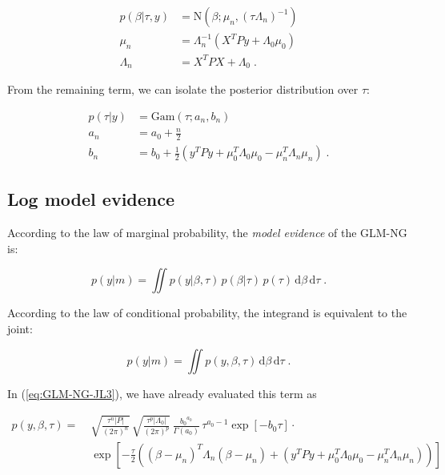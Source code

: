 \vspace{-0.5em}
\begin{equation} \label{eq:GLM-NG-post-beta}
\begin{split}
p(\beta|\tau,y) &= \mathrm{N}(\beta; \mu_n, (\tau \Lambda_n)^{-1}) \\
\mu_n &= \Lambda_n^{-1} (X^T P y + \Lambda_0 \mu_0) \\
\Lambda_n &= X^T P X + \Lambda_0 \; .
\end{split}
\end{equation}

From the remaining term, we can isolate the posterior distribution over $\tau$:

\vspace{-0.5em}
\begin{equation} \label{eq:GLM-NG-post-tau}
\begin{split}
p(\tau|y) &= \mathrm{Gam}(\tau; a_n, b_n) \\
a_n &= a_0 + \frac{n}{2} \\
b_n &= b_0 + \frac{1}{2} (y^T P y + \mu_0^T \Lambda_0 \mu_0 - \mu_n^T \Lambda_n \mu_n) \; .
\end{split}
\end{equation}


\subsection{Log model evidence} \label{sec:GLM-NG-LME}

According to the law of marginal probability, the \textit{model evidence} of the GLM-NG is:

\begin{equation} \label{eq:GLM-NG-ME1}
p(y|m) = \iint p(y|\beta,\tau) \, p(\beta|\tau) \, p(\tau) \, \mathrm{d}\beta \, \mathrm{d}\tau \; .
\end{equation}

According to the law of conditional probability, the integrand is equivalent to the joint:

\begin{equation} \label{eq:GLM-NG-ME2}
p(y|m) = \iint p(y,\beta,\tau) \, \mathrm{d}\beta \, \mathrm{d}\tau \; .
\end{equation}

\pagebreak
In (\ref{eq:GLM-NG-JL3}), we have already evaluated this term as

\vspace{-0.5em}
\begin{equation} \label{eq:GLM-NG-LME1}
\begin{split}
p(y,\beta,\tau) = \; & \sqrt{\frac{\tau^n |P|}{(2 \pi)^n}} \, \sqrt{\frac{\tau^p |\Lambda_0|}{(2 \pi)^p}} \, \frac{{b_0}^{a_0}}{\Gamma(a_0)} \, \tau^{a_0-1} \exp[-b_0 \tau] \cdot \\
& \exp\left[ -\frac{\tau}{2} \left( (\beta-\mu_n)^T \Lambda_n (\beta-\mu_n) + (y^T P y + \mu_0^T \Lambda_0 \mu_0 - \mu_n^T \Lambda_n \mu_n) \right) \right]
\end{split}
\end{equation}

